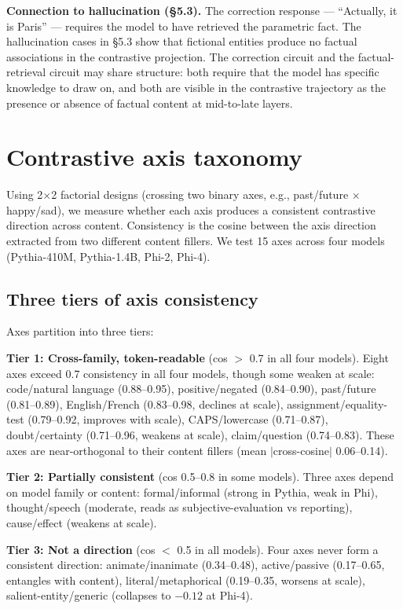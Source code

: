 \documentclass[11pt]{article}
\begin{document}
\textbf{Connection to hallucination (\S5.3).} The correction response --- ``Actually,
it is Paris'' --- requires the model to have retrieved the parametric fact.
The hallucination cases in \S5.3 show that fictional entities produce no
factual associations in the contrastive projection. The correction circuit
and the factual-retrieval circuit may share structure: both require that the
model has specific knowledge to draw on, and both are visible in the
contrastive trajectory as the presence or absence of factual content at
mid-to-late layers.

\section{Contrastive axis taxonomy}

Using 2$\times$2 factorial designs (crossing two binary axes, e.g., past/future $\times$
happy/sad), we measure whether each axis produces a consistent contrastive
direction across content. Consistency is the cosine between the axis direction
extracted from two different content fillers. We test 15 axes across four models
(Pythia-410M, Pythia-1.4B, Phi-2, Phi-4).

\subsection{Three tiers of axis consistency}

Axes partition into three tiers:

\textbf{Tier 1: Cross-family, token-readable} (cos $>$ 0.7 in all four models).
Eight axes exceed 0.7 consistency in all four models, though some weaken at
scale: code/natural language (0.88--0.95), positive/negated (0.84--0.90),
past/future (0.81--0.89), English/French (0.83--0.98, declines at scale),
assignment/equality-test (0.79--0.92, improves with scale),
CAPS/lowercase (0.71--0.87), doubt/certainty (0.71--0.96, weakens at scale),
claim/question (0.74--0.83). These axes are near-orthogonal to their content fillers
(mean $|$cross-cosine$|$ 0.06--0.14).

\textbf{Tier 2: Partially consistent} (cos 0.5--0.8 in some models).
Three axes depend on model family or content: formal/informal (strong in
Pythia, weak in Phi), thought/speech (moderate, reads as
subjective-evaluation vs reporting), cause/effect (weakens at scale).

\textbf{Tier 3: Not a direction} (cos $<$ 0.5 in all models).
Four axes never form a consistent direction: animate/inanimate (0.34--0.48),
active/passive (0.17--0.65, entangles with content), literal/metaphorical
(0.19--0.35, worsens at scale), salient-entity/generic (collapses to $-0.12$
at Phi-4).
\end{document}
